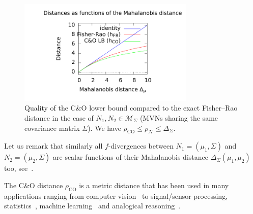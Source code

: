 \documentclass[entropy,article,accept,oneauthor,pdftex,entropy]{Definitions/mdpi}
\def\calM{\mathcal{M}}
\def\CO{\mathrm{CO}}
\def\calN{\mathcal{N}}
\begin{document}
\begin{figure}[H]

\includegraphics[width=0.75\textwidth]{Plot-FRCOLB.pdf}
\caption{Quality of the C\&O lower bound compared to the exact Fisher–Rao distance in the case of $N_1,N_2\in\calM_\Sigma$ (MVNs sharing the same covariance matrix $\Sigma$). We have $\rho_\CO\leq \rho_\calN\leq \Delta_\Sigma$. \label{fig:qualityFRCO}}
\end{figure}


Let us  remark that similarly all $f$-divergences between $N_1=(\mu_1,\Sigma)$ and $N_2=(\mu_2,\Sigma)$ are scalar functions of their Mahalanobis distance $\Delta_\Sigma(\mu_1,\mu_2)$ too, see~\cite{nielsen2022note}.


The C\&O distance $\rho_{\CO}$ is a metric distance that has been used in many applications ranging from computer vision~\cite{ceolin2012computing,wang2017g2denet,nguyen2021geomnet,miyamoto2022fisher} to signal/sensor processing, statistics~\cite{kurtek2015bayesian,marti2016optimal}, machine learning~\cite{tang2018information,DA-FisherRaoMVN-2015,li2016local,liang2019fisher,picot2022adversarial,collas2022use} and analogical reasoning~\cite{murena2018opening}.
\end{document}
